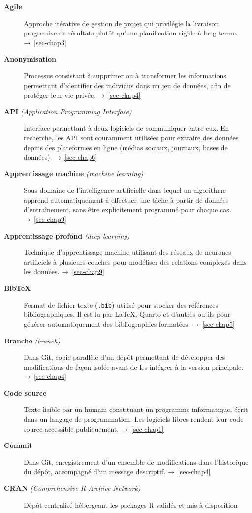 \documentclass[
  letterpaper,
  DIV=11,
  numbers=noendperiod,
  oneside]{scrreprt}
\begin{document}
\begin{description}
\item[\textbf{Agile}]
Approche itérative de gestion de projet qui privilégie la livraison
progressive de résultats plutôt qu'une planification rigide à long
terme. →~\ref{sec-chap3}
\item[\textbf{Anonymisation}]
Processus consistant à supprimer ou à transformer les informations
permettant d'identifier des individus dans un jeu de données, afin de
protéger leur vie privée. →~\ref{sec-chap4}
\item[\textbf{API} \emph{(Application Programming Interface)}]
Interface permettant à deux logiciels de communiquer entre eux. En
recherche, les API sont couramment utilisées pour extraire des données
depuis des plateformes en ligne (médias sociaux, journaux, bases de
données). →~\ref{sec-chap6}
\item[\textbf{Apprentissage machine} \emph{(machine learning)}]
Sous-domaine de l'intelligence artificielle dans lequel un algorithme
apprend automatiquement à effectuer une tâche à partir de données
d'entraînement, sans être explicitement programmé pour chaque cas.
→~\ref{sec-chap9}
\item[\textbf{Apprentissage profond} \emph{(deep learning)}]
Technique d'apprentissage machine utilisant des réseaux de neurones
artificiels à plusieurs couches pour modéliser des relations complexes
dans les données. →~\ref{sec-chap9}
\item[\textbf{BibTeX}]
Format de fichier texte (\texttt{.bib}) utilisé pour stocker des
références bibliographiques. Il est lu par LaTeX, Quarto et d'autres
outils pour générer automatiquement des bibliographies formatées.
→~\ref{sec-chap5}
\item[\textbf{Branche} \emph{(branch)}]
Dans Git, copie parallèle d'un dépôt permettant de développer des
modifications de façon isolée avant de les intégrer à la version
principale. →~\ref{sec-chap4}
\item[\textbf{Code source}]
Texte lisible par un humain constituant un programme informatique, écrit
dans un langage de programmation. Les logiciels libres rendent leur code
source accessible publiquement. →~\ref{sec-chap1}
\item[\textbf{Commit}]
Dans Git, enregistrement d'un ensemble de modifications dans
l'historique du dépôt, accompagné d'un message descriptif.
→~\ref{sec-chap4}
\item[\textbf{CRAN} \emph{(Comprehensive R Archive Network)}]
Dépôt centralisé hébergeant les packages R validés et mis à disposition

\end{description}
\end{document}
